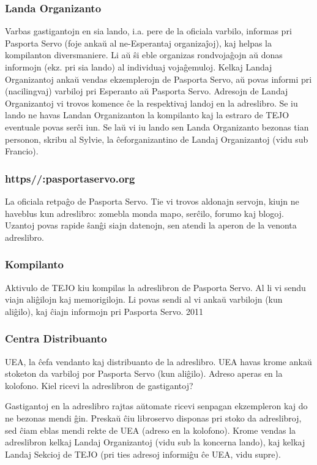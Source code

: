 \subsubsection{Landa Organizanto}
Varbas gastigantojn en sia lando, i.a. pere de la oficiala varbilo, informas pri
Pasporta Servo (foje ankaŭ al ne-Esperantaj organizaĵoj), kaj helpas la kompilanton
diversmaniere. Li aŭ ŝi eble organizas rondvojaĝojn aŭ donas informojn (ekz. pri
sia lando) al individuaj vojaĝemuloj. Kelkaj Landaj Organizantoj ankaŭ vendas
ekzemplerojn de Pasporta Servo, aŭ povas informi pri (nacilingvaj) varbiloj pri
Esperanto aŭ Pasporta Servo. Adresojn de Landaj Organizantoj vi trovos komence
ĉe la respektivaj landoj en la adreslibro. Se iu lando ne havas Landan Organizanton
la kompilanto kaj la estraro de TEJO eventuale povas serĉi iun. Se laŭ vi iu lando
sen Landa Organizanto bezonas tian personon, skribu al Sylvie, la ĉeforganizantino
de Landaj Organizantoj (vidu sub Francio).
\subsubsection{https//:pasportaservo.org}
La oficiala retpaĝo de Pasporta Servo. Tie vi trovos aldonajn servojn, kiujn ne
haveblus kun adreslibro: zomebla monda mapo, serĉilo, forumo kaj blogoj. Uzantoj
povas rapide ŝanĝi siajn datenojn, sen atendi la aperon de la venonta adreslibro.
\subsubsection{Kompilanto}
Aktivulo de TEJO kiu kompilas la adreslibron de Pasporta Servo. Al li vi sendu
viajn aliĝilojn kaj memorigilojn. Li povas sendi al vi ankaŭ varbilojn (kun aliĝilo), kaj
ĉiajn informojn pri Pasporta Servo.
2011	
\subsubsection{Centra Distribuanto}
UEA, la ĉefa vendanto kaj distribuanto de la adreslibro. UEA havas krome ankaŭ
stoketon da varbiloj por Pasporta Servo (kun aliĝilo). Adreso aperas en la kolofono.
Kiel ricevi la adreslibron de gastigantoj?

Gastigantoj en la adreslibro rajtas aŭtomate ricevi senpagan ekzempleron kaj do
ne bezonas mendi ĝin. Preskaŭ ĉiu libroservo disponas pri stoko da adreslibroj,
sed ĉiam eblas mendi rekte de UEA (adreso en la kolofono). Krome vendas la
adreslibron kelkaj Landaj Organizantoj (vidu sub la koncerna lando), kaj kelkaj
Landaj Sekcioj de TEJO (pri ties adresoj informiĝu ĉe UEA, vidu supre).
